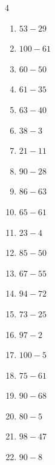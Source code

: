\begin{multicols}{4}
\begin{enumerate}
  \item $53-29$
        \phantom{$=24$}

  \item $100-61$
        \phantom{$=39$}

  \item $60-50$
        \phantom{$=10$}

  \item $61-35$
        \phantom{$=26$}

  \item $63-40$
        \phantom{$=23$}

  \item $38-3$
        \phantom{$=35$}

  \item $21-11$
        \phantom{$=10$}

  \item $90-28$
        \phantom{$=62$}

  \item $86-63$
        \phantom{$=23$}

  \item $65-61$
        \phantom{$=4$}

  \item $23-4$
        \phantom{$=19$}

  \item $85-50$
        \phantom{$=35$}

  \item $67-55$
        \phantom{$=12$}

  \item $94-72$
        \phantom{$=22$}

  \item $73-25$
        \phantom{$=48$}

  \item $97-2$
        \phantom{$=95$}

  \item $100-5$
        \phantom{$=95$}

  \item $75-61$
        \phantom{$=14$}

  \item $90-68$
        \phantom{$=22$}

  \item $80-5$
        \phantom{$=75$}

  \item $98-47$
        \phantom{$=51$}

  \item $90-8$
        \phantom{$=82$}


\end{enumerate}
\end{multicols}
